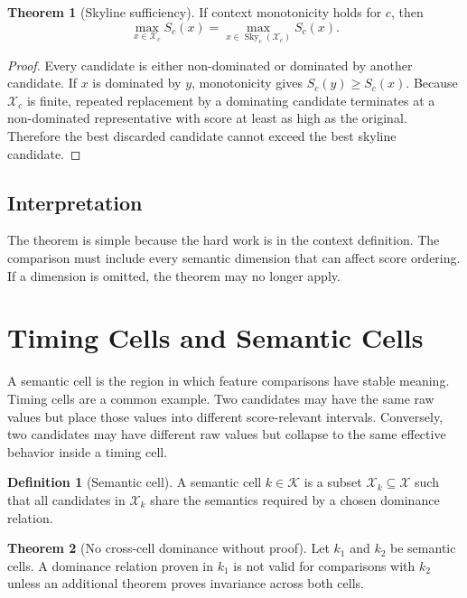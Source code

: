 \documentclass[11pt,oneside]{article}
\theoremstyle{definition}
\newtheorem{definition}{Definition}[section]
\newtheorem{theorem}{Theorem}[section]
\newcommand{\Sky}{\operatorname{Sky}}
\newcommand{\cand}{\mathcal{X}}
\newcommand{\score}{S}
\newcommand{\Cell}{\mathcal{K}}
\begin{document}
\begin{theorem}[Skyline sufficiency]
If context monotonicity holds for \(c\), then
\[
  \max_{x\in\cand_c}\score_c(x)
  =
  \max_{x\in\Sky_c(\cand_c)}\score_c(x).
\]
\end{theorem}

\begin{proof}
Every candidate is either non-dominated or dominated by another candidate. If \(x\) is dominated by \(y\), monotonicity gives \(\score_c(y)\ge\score_c(x)\). Because \(\cand_c\) is finite, repeated replacement by a dominating candidate terminates at a non-dominated representative with score at least as high as the original. Therefore the best discarded candidate cannot exceed the best skyline candidate.
\end{proof}

\subsection{Interpretation}
The theorem is simple because the hard work is in the context definition. The comparison must include every semantic dimension that can affect score ordering. If a dimension is omitted, the theorem may no longer apply.

\section{Timing Cells and Semantic Cells}

A semantic cell is the region in which feature comparisons have stable meaning. Timing cells are a common example. Two candidates may have the same raw values but place those values into different score-relevant intervals. Conversely, two candidates may have different raw values but collapse to the same effective behavior inside a timing cell.

\begin{definition}[Semantic cell]
A semantic cell \(k\in\Cell\) is a subset \(\cand_k\subseteq\cand\) such that all candidates in \(\cand_k\) share the semantics required by a chosen dominance relation.
\end{definition}

\begin{theorem}[No cross-cell dominance without proof]
Let \(k_1\) and \(k_2\) be semantic cells. A dominance relation proven in \(k_1\) is not valid for comparisons with \(k_2\) unless an additional theorem proves invariance across both cells.
\end{theorem}
\end{document}
